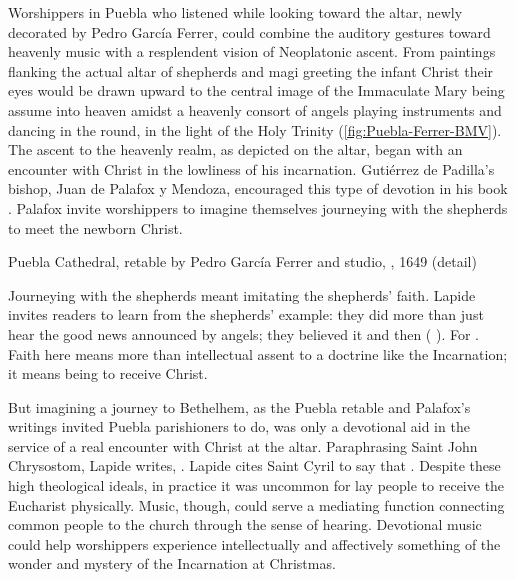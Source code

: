 Worshippers in Puebla who listened while looking toward the altar, newly
decorated by Pedro García Ferrer, could combine the auditory gestures toward
heavenly music with a resplendent vision of Neoplatonic ascent.%
    \Autocite{Gali:GarciaFerrer}
From paintings flanking the actual altar of shepherds and magi greeting the
infant Christ their eyes would be drawn upward to the central image of the
Immaculate Mary being assume into heaven amidst a heavenly consort of angels
playing instruments and dancing in the round, in the light of the Holy Trinity
(\cref{fig:Puebla-Ferrer-BMV}).
The ascent to the heavenly realm, as depicted on the altar, began with an
encounter with Christ in the lowliness of his incarnation. 
Gutiérrez de Padilla's bishop, Juan de  Palafox y Mendoza, encouraged this type
of devotion in his book .%
    \Autocite{Palafox:Nochebuena}
Palafox invite worshippers to imagine themselves journeying with the shepherds
to meet the newborn Christ.

{Puebla Cathedral, retable by Pedro García Ferrer and studio,
, 1649 (detail)} 

Journeying with the shepherds meant imitating the shepherds' faith.
Lapide invites readers to learn from the shepherds' example: they did more than
just hear the good news announced by angels; they believed it and then
( \XXX).
For .%
    \Autocite[677, on ]{Lapide:Gospels19C}
Faith here means more than intellectual assent to a doctrine like the
Incarnation; it means being  to receive Christ.

But imagining a journey to Bethelhem, as the Puebla retable and Palafox's
writings invited Puebla parishioners to do, was only a devotional aid in the
service of a real encounter with Christ at the altar.
Paraphrasing Saint John Chrysostom, Lapide writes, .%
    \Autocite[672, on ]{Lapide:Gospels19C}
Lapide cites Saint Cyril to say that .
Despite these high theological ideals, in practice it was uncommon for lay
people to receive the Eucharist physically.
Music, though, could serve a mediating function connecting common people to the
church through the sense of hearing.
Devotional music could help worshippers experience intellectually and
affectively something of the wonder and mystery of the Incarnation at
Christmas.

